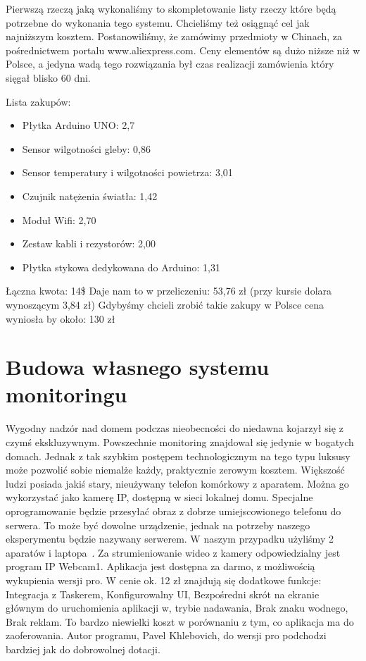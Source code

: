 \documentclass[brudnopis]{xmgr}
\begin{document}
Pierwszą rzeczą jaką wykonaliśmy to skompletowanie listy rzeczy które będą potrzebne do wykonania tego systemu. Chcieliśmy też osiągnąć cel jak najniższym kosztem. Postanowiliśmy, że zamówimy przedmioty w Chinach, za pośrednictwem portalu www.aliexpress.com. Ceny elementów są dużo niższe niż w Polsce, a jedyna wadą tego rozwiązania był czas realizacji zamówienia który sięgał blisko 60 dni.

Lista zakupów:
\begin{itemize}
\item Płytka Arduino UNO: 2,7
\item Sensor wilgotności gleby: 0,86
\item Sensor temperatury i wilgotności powietrza: 3,01
\item Czujnik natężenia światła: 1,42
\item Moduł Wifi: 2,70
\item Zestaw kabli i rezystorów: 2,00
\item Płytka stykowa dedykowana do Arduino: 1,31
\end{itemize}
Łączna kwota: 14\$
Daje nam to w przeliczeniu: 53,76 zł (przy kursie dolara wynoszącym 3,84 zł)
Gdybyśmy chcieli zrobić takie zakupy w Polsce cena wyniosła by około: 130 zł 

\section{Budowa własnego systemu monitoringu}

Wygodny nadzór nad domem podczas nieobecności do niedawna kojarzył się z czymś ekskluzywnym. Powszechnie monitoring znajdował się jedynie w bogatych domach. Jednak z tak szybkim postępem technologicznym na tego typu luksusy może pozwolić sobie niemalże każdy, praktycznie zerowym kosztem. Większość ludzi posiada jakiś stary, nieużywany telefon komórkowy z aparatem. Można go wykorzystać jako kamerę IP, dostępną w sieci lokalnej domu. Specjalne oprogramowanie będzie przesyłać obraz z dobrze umiejscowionego telefonu do serwera. To może być dowolne urządzenie, jednak na potrzeby naszego eksperymentu będzie nazywany serwerem. W naszym przypadku użyliśmy 2 aparatów i laptopa~\cite{Learning}.
Za strumieniowanie wideo z kamery odpowiedzialny jest program IP Webcam1. Aplikacja jest dostępna za darmo, z możliwością wykupienia wersji pro. W cenie ok. 12 zł znajdują się dodatkowe funkcje:
Integracja z Taskerem,
Konfigurowalny UI,
Bezpośredni skrót na ekranie głównym do uruchomienia aplikacji w, trybie nadawania,
Brak znaku wodnego,
Brak reklam.
To bardzo niewielki koszt w porównaniu z tym, co aplikacja ma do zaoferowania. Autor programu, Pavel Khlebovich, do wersji pro  podchodzi bardziej jak do dobrowolnej dotacji.
\end{document}
